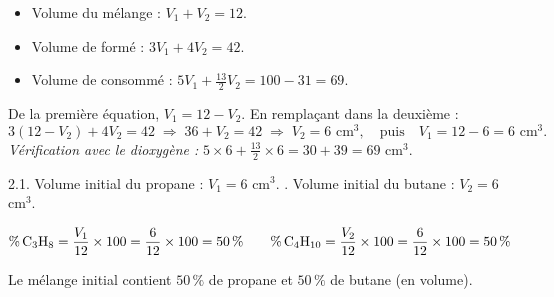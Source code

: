 \begin{itemize}
  \item Volume du mélange : $V_1 + V_2 = 12$.
  \item Volume de  formé : $3V_1 + 4V_2 = 42$.
  \item Volume de  consommé : $5V_1 + \frac{13}{2}V_2 = 100 - 31 = 69$.
\end{itemize}
De la première équation, $V_1 = 12 - V_2$. En remplaçant dans la deuxième :
\[
3(12 - V_2) + 4V_2 = 42 \;\Longrightarrow\; 36 + V_2 = 42 \;\Longrightarrow\; V_2 = 6 \text{ cm}^3,
\quad\text{puis}\quad V_1 = 12 - 6 = 6 \text{ cm}^3.
\]
\emph{Vérification avec le dioxygène :} $5 \times 6 + \frac{13}{2} \times 6 = 30 + 39 = 69$ cm$^3$.
\begin{resultat}
2.1. Volume initial du propane : $V_1 = 6$ cm$^3$. . Volume initial du butane : $V_2 = 6$ cm$^3$.
\end{resultat}

\[
\%\,\ce{C3H8} = \frac{V_1}{12} \times 100 = \frac{6}{12} \times 100 = 50\,\%
\qquad
\%\,\ce{C4H10} = \frac{V_2}{12} \times 100 = \frac{6}{12} \times 100 = 50\,\%
\]
\begin{resultat}
Le mélange initial contient $50\,\%$ de propane et $50\,\%$ de butane (en volume).
\end{resultat}


